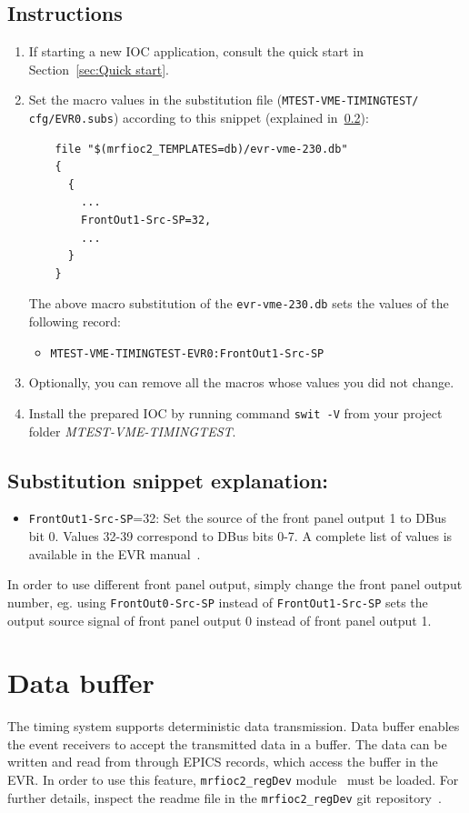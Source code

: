 \documentclass[12pt,a4paper]{article}
\begin{document}
\subsection{Instructions}
\begin{enumerate}
	\item If starting a new IOC application, consult the quick start in Section~\ref{sec:Quick start}.
	
	\item Set the macro values in the substitution file (\texttt{MTEST-VME-TIMINGTEST/} \texttt{cfg/EVR0.subs}) according to this snippet (explained in~\ref{sec:explain_dbus}):
\begin{verbatim}
	file "$(mrfioc2_TEMPLATES=db)/evr-vme-230.db"
	{
	  {
	    ...
	    FrontOut1-Src-SP=32,
	    ...
	  }
	}
\end{verbatim}
	The above macro substitution of the \texttt{evr-vme-230.db} sets the values of the following record:
	\begin{itemize}
		\item \texttt{MTEST-VME-TIMINGTEST-EVR0:FrontOut1-Src-SP}
	\end{itemize}

	\item Optionally, you can remove all the macros whose values you did not change. 
	\item Install the prepared IOC by running command \texttt{swit -V} from your project folder \textit{MTEST-VME-TIMINGTEST}.
\end{enumerate}

\subsection{Substitution snippet explanation:}\label{sec:explain_dbus}
\begin{itemize}
	\item \texttt{FrontOut1-Src-SP}=32: Set the source of the front panel output 1  to DBus bit 0. Values 32-39 correspond to DBus bits 0-7. A complete list of values is available in the EVR manual~\cite{evr_manual}.
\end{itemize}

In order to use different front panel output, simply change the front panel output number, eg. using \texttt{FrontOut0-Src-SP} instead of \texttt{FrontOut1-Src-SP} sets the output source signal of front panel output 0 instead of front panel output 1.

\section{Data buffer}\label{sec:data_buffer}
The timing system supports deterministic data transmission. Data buffer enables the event receivers to accept the transmitted data in a buffer. The data can be written and read from through EPICS records, which access the buffer in the EVR. In order to use this feature, \texttt{mrfioc2\_regDev} module~\cite{git_mrfioc2_regDev} must be loaded. For further details, inspect the readme file in the \texttt{mrfioc2\_regDev} git repository~\cite{git_mrfioc2_regDev}.
\end{document}
